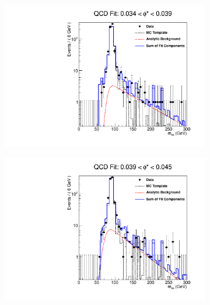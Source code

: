 \begin{figure}[!htbp]
    \centering
    \begin{subfigure}[b]{\SideBySidePlotWidth}
        \includegraphics[width=\linewidth]{figures/qcd_fits/qcd_fit_plot_for_09.pdf}
        \label{fig:qcd_fit_09}
    \end{subfigure}%
    \begin{subfigure}[b]{\SideBySidePlotWidth}
        \includegraphics[width=\linewidth]{figures/qcd_fits/qcd_fit_plot_for_10.pdf}
        \label{fig:qcd_fit_10}
    \end{subfigure}
    \begin{subfigure}[b]{\SideBySidePlotWidth}

\end{subfigure}
\end{figure}
